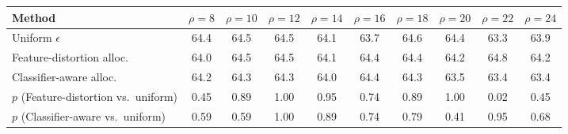 \begin{tabular}{lccccccccc}
\toprule
Method & $\rho=8$ & $\rho=10$ & $\rho=12$ & $\rho=14$ & $\rho=16$ & $\rho=18$ & $\rho=20$ & $\rho=22$ & $\rho=24$ \\
\midrule
Uniform $\epsilon$ & 64.4 & 64.5 & 64.5 & 64.1 & 63.7 & 64.6 & 64.4 & 63.3 & 63.9 \\
Feature-distortion alloc. & 64.0 & 64.5 & 64.5 & 64.1 & 64.4 & 64.4 & 64.2 & 64.8 & 64.2 \\
Classifier-aware alloc. & 64.2 & 64.3 & 64.3 & 64.0 & 64.4 & 64.3 & 63.5 & 63.4 & 63.4 \\
\quad $p$ (Feature-distortion vs.\ uniform) & 0.45 & 0.89 & 1.00 & 0.95 & 0.74 & 0.89 & 1.00 & 0.02 & 0.45 \\
\quad $p$ (Classifier-aware vs.\ uniform) & 0.59 & 0.59 & 1.00 & 0.89 & 0.74 & 0.79 & 0.41 & 0.95 & 0.68 \\
\bottomrule
\end{tabular}
